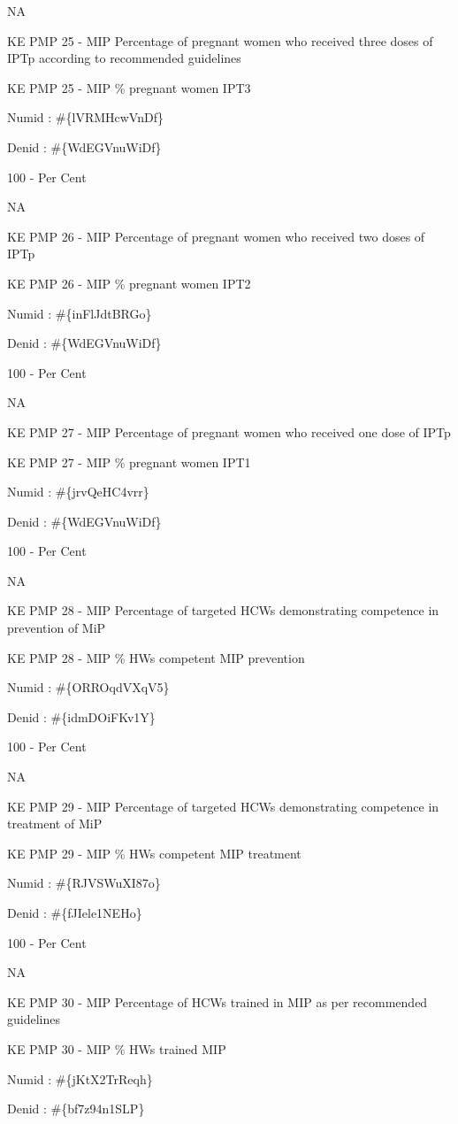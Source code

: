 \documentclass[]{book}
\begin{document}
NA

KE PMP 25 - MIP Percentage of pregnant women who received three doses of IPTp according to recommended guidelines

KE PMP 25 - MIP \% pregnant women IPT3

Numid : \#\{lVRMHcwVnDf\}

Denid : \#\{WdEGVnuWiDf\}

100 - Per Cent

NA

KE PMP 26 - MIP Percentage of pregnant women who received two doses of IPTp

KE PMP 26 - MIP \% pregnant women IPT2

Numid : \#\{inFlJdtBRGo\}

Denid : \#\{WdEGVnuWiDf\}

100 - Per Cent

NA

KE PMP 27 - MIP Percentage of pregnant women who received one dose of IPTp

KE PMP 27 - MIP \% pregnant women IPT1

Numid : \#\{jrvQeHC4vrr\}

Denid : \#\{WdEGVnuWiDf\}

100 - Per Cent

NA

KE PMP 28 - MIP Percentage of targeted HCWs demonstrating competence in prevention of MiP

KE PMP 28 - MIP \% HWs competent MIP prevention

Numid : \#\{ORROqdVXqV5\}

Denid : \#\{idmDOiFKv1Y\}

100 - Per Cent

NA

KE PMP 29 - MIP Percentage of targeted HCWs demonstrating competence in treatment of MiP

KE PMP 29 - MIP \% HWs competent MIP treatment

Numid : \#\{RJVSWuXI87o\}

Denid : \#\{fJIele1NEHo\}

100 - Per Cent

NA

KE PMP 30 - MIP Percentage of HCWs trained in MIP as per recommended guidelines

KE PMP 30 - MIP \% HWs trained MIP

Numid : \#\{jKtX2TrReqh\}

Denid : \#\{bf7z94n1SLP\}
\end{document}

